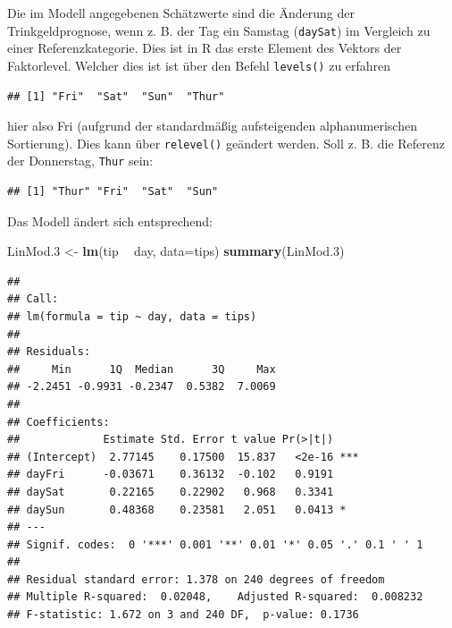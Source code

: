 \documentclass[12pt,ngerman,paper=a4,pagesize,DIV=13]{scrreprt}
\newenvironment{Shaded}{\begin{snugshade}}{\end{snugshade}}
\newcommand{\DataTypeTok}[1]{\textcolor[rgb]{0.13,0.29,0.53}{#1}}
\newcommand{\FloatTok}[1]{\textcolor[rgb]{0.00,0.00,0.81}{#1}}
\newcommand{\KeywordTok}[1]{\textcolor[rgb]{0.13,0.29,0.53}{\textbf{#1}}}
\newcommand{\NormalTok}[1]{#1}
\newcommand{\OperatorTok}[1]{\textcolor[rgb]{0.81,0.36,0.00}{\textbf{#1}}}
\newcommand{\StringTok}[1]{\textcolor[rgb]{0.31,0.60,0.02}{#1}}
\begin{document}
Die im Modell angegebenen Schätzwerte sind die Änderung der
Trinkgeldprognose, wenn z. B. der Tag ein Samstag (\texttt{daySat}) im
Vergleich zu einer Referenzkategorie. Dies ist in R das erste Element
des Vektors der Faktorlevel. Welcher dies ist ist über den Befehl
\texttt{levels()} zu erfahren

\begin{Shaded}
\end{Shaded}

\begin{verbatim}
## [1] "Fri"  "Sat"  "Sun"  "Thur"
\end{verbatim}

hier also Fri (aufgrund der standardmäßig aufsteigenden alphanumerischen
Sortierung). Dies kann über \texttt{relevel()} geändert werden. Soll z.
B. die Referenz der Donnerstag, \texttt{Thur} sein:

\begin{Shaded}
\end{Shaded}

\begin{verbatim}
## [1] "Thur" "Fri"  "Sat"  "Sun"
\end{verbatim}

Das Modell ändert sich entsprechend:

\begin{Shaded}
\begin{Highlighting}[]
\NormalTok{LinMod}\FloatTok{.3}\NormalTok{ <-}\StringTok{ }\KeywordTok{lm}\NormalTok{(tip }\OperatorTok{~}\StringTok{ }\NormalTok{day, }\DataTypeTok{data=}\NormalTok{tips)}
\KeywordTok{summary}\NormalTok{(LinMod}\FloatTok{.3}\NormalTok{)}
\end{Highlighting}
\end{Shaded}

\begin{verbatim}
## 
## Call:
## lm(formula = tip ~ day, data = tips)
## 
## Residuals:
##     Min      1Q  Median      3Q     Max 
## -2.2451 -0.9931 -0.2347  0.5382  7.0069 
## 
## Coefficients:
##             Estimate Std. Error t value Pr(>|t|)    
## (Intercept)  2.77145    0.17500  15.837   <2e-16 ***
## dayFri      -0.03671    0.36132  -0.102   0.9191    
## daySat       0.22165    0.22902   0.968   0.3341    
## daySun       0.48368    0.23581   2.051   0.0413 *  
## ---
## Signif. codes:  0 '***' 0.001 '**' 0.01 '*' 0.05 '.' 0.1 ' ' 1
## 
## Residual standard error: 1.378 on 240 degrees of freedom
## Multiple R-squared:  0.02048,    Adjusted R-squared:  0.008232 
## F-statistic: 1.672 on 3 and 240 DF,  p-value: 0.1736
\end{verbatim}
\end{document}
